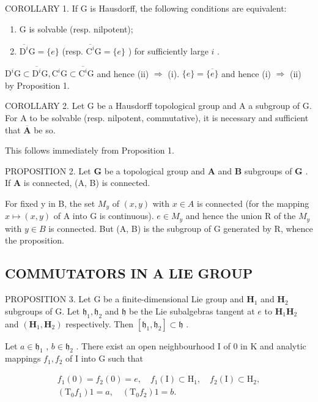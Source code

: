 COROLLARY 1. If G is Hausdorff, the following conditions are equivalent:

\begin{enumerate}
\def\labelenumi{(\roman{enumi})}
\item
  G is solvable (resp. nilpotent);
\item
  \(\overline{\mathrm{D}^{i}}\mathrm{G} = \{e\}\) (resp. \(\overline{\mathrm{C}^{i}}\mathrm{G} = \{e\}\) ) for sufficiently large \(i\) .
\end{enumerate}

\(\mathrm{D}^{i}\mathrm{G} \subset \overline{\mathrm{D}^{i}}\mathrm{G}, \mathrm{C}^{i}\mathrm{G} \subset \overline{\mathrm{C}^{i}}\mathrm{G}\) and hence (ii) \(\Rightarrow\) (i). \(\{e\} = \overline{\{e\}}\) and hence (i) \(\Rightarrow\) (ii) by Proposition 1.

COROLLARY 2. Let G be a Hausdorff topological group and A a subgroup of G. For A to be solvable (resp. nilpotent, commutative), it is necessary and sufficient that \(\overline{\mathbf{A}}\) be so.

This follows immediately from Proposition 1.

PROPOSITION 2. Let \(\mathbf{G}\) be a topological group and \(\mathbf{A}\) and \(\mathbf{B}\) subgroups of \(\mathbf{G}\) . If \(\mathbf{A}\) is connected, (A, B) is connected.

For fixed y in B, the set \(M_{y}\) of \((x,y)\) with \(x \in A\) is connected (for the mapping \(x \mapsto (x,y)\) of A into G is continuous). \(e \in M_{y}\) and hence the union R of the \(M_{y}\) with \(y \in B\) is connected. But (A, B) is the subgroup of G generated by R, whence the proposition.

\subsection{COMMUTATORS IN A LIE GROUP}

PROPOSITION 3. Let G be a finite-dimensional Lie group and \(\mathbf{H}_1\) and \(\mathbf{H}_2\) subgroups of G. Let \(\mathfrak{h}_1, \mathfrak{h}_2\) and \(\mathfrak{h}\) be the Lie subalgebras tangent at \(e\) to \(\mathbf{H}_1\mathbf{H}_2\) and \((\mathbf{H}_1,\mathbf{H}_2)\) respectively. Then \([\mathfrak{h}_1,\mathfrak{h}_2] \subset \mathfrak{h}\) .

Let \(a \in \mathfrak{h}_1\) , \(b \in \mathfrak{h}_2\) . There exist an open neighbourhood I of 0 in K and analytic mappings \(f_1, f_2\) of I into G such that

\[
\begin{array}{c} f _ {1} (0) = f _ {2} (0) = e, \quad f _ {1} (\mathrm{I}) \subset \mathrm{H} _ {1}, \quad f _ {2} (\mathrm{I}) \subset \mathrm{H} _ {2}, \\ (\mathrm{T} _ {0} f _ {1}) 1 = a, \quad (\mathrm{T} _ {0} f _ {2}) 1 = b. \end{array}
\]

